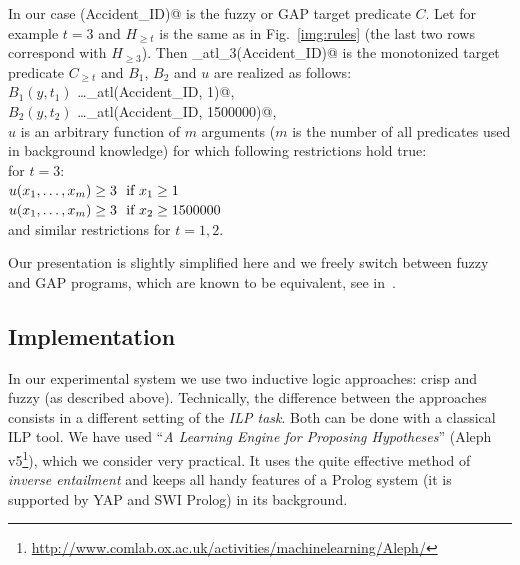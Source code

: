 In our case \verb@serious(Accident_ID)@ is the fuzzy or GAP target predicate $C$. Let for example $t=3$ and $H_{\ge t}$ is the same as in Fig.~\ref{img:rules} (the last two rows correspond with $H_{\ge 3}$). Then \verb@serious_atl_3(Accident_ID)@ is the monotonized target predicate $C_{\ge t}$ and $B_1$, $B_2$ and $u$ are realized as follows:\\
\hspace*{1cm}$B_1(y,t_1)$ \dots \verb@fatalities_atl(Accident_ID, 1)@,\\
\hspace*{1cm}$B_2(y,t_2)$ \dots \verb@damage_atl(Accident_ID, 1500000)@,\\
$u$ is an arbitrary function of $m$ arguments ($m$ is the number of all predicates used in background knowledge) for which following restrictions hold true:\\
for $t=3$:\\
\hspace*{1cm}$u(x_1,\dots,x_m) \ge 3 \ \hbox{ if }x_1\ge 1$\\
\hspace*{1cm}$u(x_1,\dots,x_m) \ge 3 \ \hbox{ if }x_2\ge 1500000$\\
and similar restrictions for $t=1,2$.


\bigskip
Our presentation is slightly simplified here and we freely switch between fuzzy and GAP programs, which are known to be equivalent, see in~\citep{biblio:KLV}.


\subsection{Implementation} \label{sec:implementation}

In our experimental system we use two inductive logic approaches: crisp and fuzzy (as described above). Technically, the difference between the approaches consists in a different setting of the \emph{ILP task}. Both can be done with a classical ILP tool. We have used 
``\emph{A Learning Engine for Proposing Hypotheses}'' (Aleph  v5\footnote{\url{http://www.comlab.ox.ac.uk/activities/machinelearning/Aleph/}}), which we consider very practical. It uses the quite effective method of \emph{inverse entailment} \citep{biblio:InverseEntailment} and keeps all handy features of a Prolog system (it is supported by YAP and SWI Prolog) in its background.

